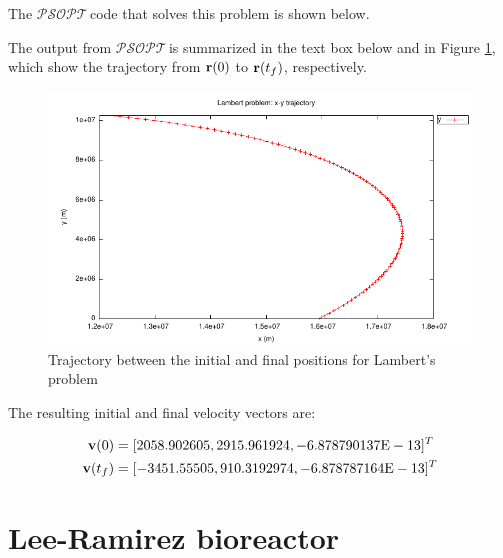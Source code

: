 \documentclass[a4paper,11pt]{report}    %
\newcommand{\psopt}{$\mathcal{PSOPT}$\,}  %
\newcommand{\mt}[1]{\ensuremath \mathbf{#1}}
\newenvironment{shadedframe}{%
  \def\FrameCommand{\fcolorbox{black}{shadecolor}}%
  \MakeFramed {\FrameRestore}}
{\endMakeFramed}
\begin{document}
The \psopt code that solves this problem is shown below.  

\tiny
\begin{shadedframe}

\end{shadedframe}
\normalsize
The output from \psopt is summarized in the text box below and in Figure
\ref{lambert_xy}, which show the trajectory from $\mt{r}(0)$ to $\mt{r}(t_f)$, respectively.

\small
\begin{shadedframe}

\end{shadedframe}
\normalsize

\begin{figure}
  \centering
  \includegraphics{../examples/lambert/lambert_xy.pdf}
  \caption{Trajectory between the initial and final positions for Lambert's problem}
  \label{lambert_xy}
\end{figure}

The resulting initial and final  velocity vectors are:

\begin{equation}
 \begin{aligned}
 \mt{v}(0) &= [2058.902605,  2915.961924, -6.878790137\mathrm{E}-13]^T 	 \\
  \mt{v}(t_f) &=[-3451.55505,  910.3192974,  -6.878787164\mathrm{E}-13 ]^T 	
 \end{aligned}
\end{equation}

\section{Lee-Ramirez bioreactor}
\end{document}
